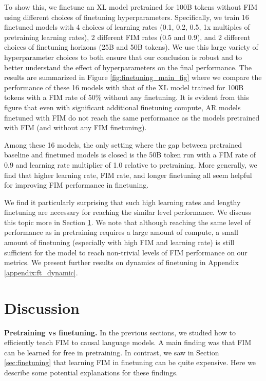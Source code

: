 \documentclass[postscript]{article}
\begin{document}
To show this, we finetune an XL model pretrained for 100B tokens without FIM using different choices of finetuning hyperparameters. Specifically, we train 16 finetuned models with 4 choices of learning rates (0.1, 0.2, 0.5, 1x multiples of pretraining learning rates), 2 different FIM rates (0.5 and 0.9), and 2 different choices of finetuning horizons (25B and 50B tokens). We use this large variety of hyperparameter choices to both ensure that our conclusion is robust and to better understand the effect of hyperparameters on the final performance. The results are summarized in Figure \ref{fig:finetuning_main_fig} where we compare the performance of these 16 models with that of the XL model trained for 100B tokens with a FIM rate of 50\% without any finetuning. It is evident from this figure that
even with significant additional finetuning compute, AR models finetuned with FIM do not reach the same performance as the models pretrained with FIM (and without any FIM finetuning).


Among these 16 models, the only setting where the gap between pretrained baseline and finetuned models is closed is the 50B token run with a FIM rate of 0.9 and learning rate multiplier of 1.0 relative to pretraining. More generally, we find that higher learning rate, FIM rate, and longer finetuning all seem helpful for improving FIM performance in finetuning.

We find it particularly surprising that such high learning rates and lengthy finetuning are necessary for reaching the similar level performance. We discuss this topic more in Section \ref{sec:discussion}. We note that although reaching the same level of performance as in pretraining requires a large amount of compute, a small amount of finetuning (especially with high FIM and learning rate) is still sufficient for the model to reach non-trivial levels of FIM performance on our metrics. We present further results on dynamics of finetuning in Appendix \ref{appendix:ft_dynamic}.

\section{Discussion}\label{sec:discussion}
 
 \textbf{Pretraining vs finetuning.} In the previous sections, we studied how to efficiently teach FIM to causal language models. A main finding was that FIM can be learned for free in  pretraining. In contrast,  we saw in Section \ref{sec:finetuning} that learning FIM in finetuning can be quite expensive. Here we describe some potential explanations for these findings. 
 
\end{document}
